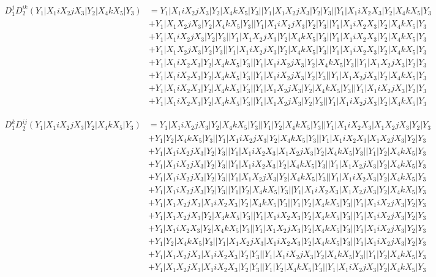\documentclass{article}[12pt]
\begin{document}
\begin{align*}
D_1^jD_2^{ik}(Y_1|X_1iX_2jX_3|Y_2|X_4kX_5|Y_3)& =Y_1|X_1iX_2jX_3|Y_2|X_4kX_5|Y_3||Y_1|X_1X_2jX_3|Y_2|Y_3||Y_1|X_1iX_2X_3|Y_2|X_4kX_5|Y_3\\ 
 & +Y_1|X_1X_2jX_3|Y_2|X_4kX_5|Y_3||Y_1|X_1iX_2jX_3|Y_2|Y_3||Y_1|X_1iX_2X_3|Y_2|X_4kX_5|Y_3\\ 
 & +Y_1|X_1iX_2jX_3|Y_2|Y_3||Y_1|X_1X_2jX_3|Y_2|X_4kX_5|Y_3||Y_1|X_1iX_2X_3|Y_2|X_4kX_5|Y_3\\ 
 & +Y_1|X_1X_2jX_3|Y_2|Y_3||Y_1|X_1iX_2jX_3|Y_2|X_4kX_5|Y_3||Y_1|X_1iX_2X_3|Y_2|X_4kX_5|Y_3\\ 
 & +Y_1|X_1iX_2X_3|Y_2|X_4kX_5|Y_3||Y_1|X_1iX_2jX_3|Y_2|X_4kX_5|Y_3||Y_1|X_1X_2jX_3|Y_2|Y_3\\ 
 & +Y_1|X_1iX_2X_3|Y_2|X_4kX_5|Y_3||Y_1|X_1iX_2jX_3|Y_2|Y_3||Y_1|X_1X_2jX_3|Y_2|X_4kX_5|Y_3\\ 
 & +Y_1|X_1iX_2X_3|Y_2|X_4kX_5|Y_3||Y_1|X_1X_2jX_3|Y_2|X_4kX_5|Y_3||Y_1|X_1iX_2jX_3|Y_2|Y_3\\ 
 & +Y_1|X_1iX_2X_3|Y_2|X_4kX_5|Y_3||Y_1|X_1X_2jX_3|Y_2|Y_3||Y_1|X_1iX_2jX_3|Y_2|X_4kX_5|Y_3\end{align*}

\begin{align*}
D_1^kD_2^{ij}(Y_1|X_1iX_2jX_3|Y_2|X_4kX_5|Y_3)& =Y_1|X_1iX_2jX_3|Y_2|X_4kX_5|Y_3||Y_1|Y_2|X_4kX_5|Y_3||Y_1|X_1iX_2X_3|X_1X_2jX_3|Y_2|Y_3\\ 
 & +Y_1|Y_2|X_4kX_5|Y_3||Y_1|X_1iX_2jX_3|Y_2|X_4kX_5|Y_3||Y_1|X_1iX_2X_3|X_1X_2jX_3|Y_2|Y_3\\ 
 & +Y_1|X_1iX_2jX_3|Y_2|Y_3||Y_1|X_1iX_2X_3|X_1X_2jX_3|Y_2|X_4kX_5|Y_3||Y_1|Y_2|X_4kX_5|Y_3\\ 
 & +Y_1|X_1iX_2jX_3|Y_2|Y_3||Y_1|X_1iX_2X_3|Y_2|X_4kX_5|Y_3||Y_1|X_1X_2jX_3|Y_2|X_4kX_5|Y_3\\ 
 & +Y_1|X_1iX_2jX_3|Y_2|Y_3||Y_1|X_1X_2jX_3|Y_2|X_4kX_5|Y_3||Y_1|X_1iX_2X_3|Y_2|X_4kX_5|Y_3\\ 
 & +Y_1|X_1iX_2jX_3|Y_2|Y_3||Y_1|Y_2|X_4kX_5|Y_3||Y_1|X_1iX_2X_3|X_1X_2jX_3|Y_2|X_4kX_5|Y_3\\ 
 & +Y_1|X_1X_2jX_3|X_1iX_2X_3|Y_2|X_4kX_5|Y_3||Y_1|Y_2|X_4kX_5|Y_3||Y_1|X_1iX_2jX_3|Y_2|Y_3\\ 
 & +Y_1|X_1X_2jX_3|Y_2|X_4kX_5|Y_3||Y_1|X_1iX_2X_3|Y_2|X_4kX_5|Y_3||Y_1|X_1iX_2jX_3|Y_2|Y_3\\ 
 & +Y_1|X_1iX_2X_3|Y_2|X_4kX_5|Y_3||Y_1|X_1X_2jX_3|Y_2|X_4kX_5|Y_3||Y_1|X_1iX_2jX_3|Y_2|Y_3\\ 
 & +Y_1|Y_2|X_4kX_5|Y_3||Y_1|X_1X_2jX_3|X_1iX_2X_3|Y_2|X_4kX_5|Y_3||Y_1|X_1iX_2jX_3|Y_2|Y_3\\ 
 & +Y_1|X_1X_2jX_3|X_1iX_2X_3|Y_2|Y_3||Y_1|X_1iX_2jX_3|Y_2|X_4kX_5|Y_3||Y_1|Y_2|X_4kX_5|Y_3\\ 
 & +Y_1|X_1X_2jX_3|X_1iX_2X_3|Y_2|Y_3||Y_1|Y_2|X_4kX_5|Y_3||Y_1|X_1iX_2jX_3|Y_2|X_4kX_5|Y_3\end{align*}
\end{document}
